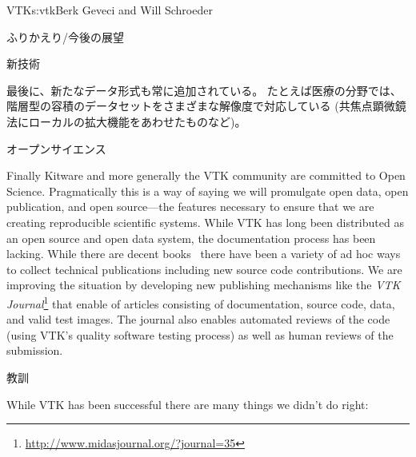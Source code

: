 \begin{aosachapter}{VTK}{s:vtk}{Berk Geveci and Will Schroeder}
\begin{aosasect1}{ふりかえり/今後の展望}
\begin{aosasect2}{新技術}
\begin{aosaitemize}
  \item 最後に、新たなデータ形式も常に追加されている。
  たとえば医療の分野では、階層型の容積のデータセットをさまざまな解像度で対応している
  (共焦点顕微鏡法にローカルの拡大機能をあわせたものなど)。

\end{aosaitemize}

\end{aosasect2}

\begin{aosasect2}{オープンサイエンス}

Finally Kitware and more generally the VTK community are committed to
Open Science. Pragmatically this is a way of saying we will promulgate
open data, open publication, and open source---the features necessary
to ensure that we are creating reproducible scientific systems. While
VTK has long been distributed as an open source and open data system,
the documentation process has been lacking. While there are decent
books~\cite{bib:vtk:userguide,bib:vtk:toolkit} there
have been a variety of ad hoc ways to collect technical publications
including new source code contributions. We are improving the
situation by developing new publishing mechanisms like the \emph{VTK
Journal}\footnote{\url{http://www.midasjournal.org/?journal=35}}
that enable of articles consisting of documentation, source code,
data, and valid test images. The journal also enables automated
reviews of the code (using VTK's quality software testing process) as
well as human reviews of the submission.

\end{aosasect2}

\begin{aosasect2}{教訓}

While VTK has been successful there are many things we didn't do
right:

\begin{aosadescription}


\end{aosadescription}
\end{aosasect2}
\end{aosasect1}
\end{aosachapter}
